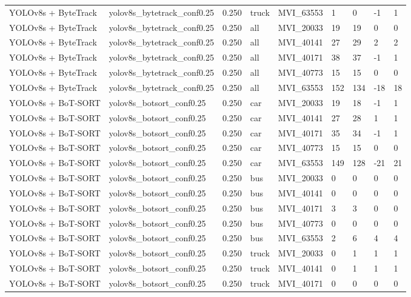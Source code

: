 \begin{tabular}{lllllllll}
YOLOv8s + ByteTrack & yolov8s\_bytetrack\_conf0.25 & 0.250 & truck & MVI\_63553 & 1 & 0 & -1 & 1 \\
YOLOv8s + ByteTrack & yolov8s\_bytetrack\_conf0.25 & 0.250 & all & MVI\_20033 & 19 & 19 & 0 & 0 \\
YOLOv8s + ByteTrack & yolov8s\_bytetrack\_conf0.25 & 0.250 & all & MVI\_40141 & 27 & 29 & 2 & 2 \\
YOLOv8s + ByteTrack & yolov8s\_bytetrack\_conf0.25 & 0.250 & all & MVI\_40171 & 38 & 37 & -1 & 1 \\
YOLOv8s + ByteTrack & yolov8s\_bytetrack\_conf0.25 & 0.250 & all & MVI\_40773 & 15 & 15 & 0 & 0 \\
YOLOv8s + ByteTrack & yolov8s\_bytetrack\_conf0.25 & 0.250 & all & MVI\_63553 & 152 & 134 & -18 & 18 \\
YOLOv8s + BoT-SORT & yolov8s\_botsort\_conf0.25 & 0.250 & car & MVI\_20033 & 19 & 18 & -1 & 1 \\
YOLOv8s + BoT-SORT & yolov8s\_botsort\_conf0.25 & 0.250 & car & MVI\_40141 & 27 & 28 & 1 & 1 \\
YOLOv8s + BoT-SORT & yolov8s\_botsort\_conf0.25 & 0.250 & car & MVI\_40171 & 35 & 34 & -1 & 1 \\
YOLOv8s + BoT-SORT & yolov8s\_botsort\_conf0.25 & 0.250 & car & MVI\_40773 & 15 & 15 & 0 & 0 \\
YOLOv8s + BoT-SORT & yolov8s\_botsort\_conf0.25 & 0.250 & car & MVI\_63553 & 149 & 128 & -21 & 21 \\
YOLOv8s + BoT-SORT & yolov8s\_botsort\_conf0.25 & 0.250 & bus & MVI\_20033 & 0 & 0 & 0 & 0 \\
YOLOv8s + BoT-SORT & yolov8s\_botsort\_conf0.25 & 0.250 & bus & MVI\_40141 & 0 & 0 & 0 & 0 \\
YOLOv8s + BoT-SORT & yolov8s\_botsort\_conf0.25 & 0.250 & bus & MVI\_40171 & 3 & 3 & 0 & 0 \\
YOLOv8s + BoT-SORT & yolov8s\_botsort\_conf0.25 & 0.250 & bus & MVI\_40773 & 0 & 0 & 0 & 0 \\
YOLOv8s + BoT-SORT & yolov8s\_botsort\_conf0.25 & 0.250 & bus & MVI\_63553 & 2 & 6 & 4 & 4 \\
YOLOv8s + BoT-SORT & yolov8s\_botsort\_conf0.25 & 0.250 & truck & MVI\_20033 & 0 & 1 & 1 & 1 \\
YOLOv8s + BoT-SORT & yolov8s\_botsort\_conf0.25 & 0.250 & truck & MVI\_40141 & 0 & 1 & 1 & 1 \\
YOLOv8s + BoT-SORT & yolov8s\_botsort\_conf0.25 & 0.250 & truck & MVI\_40171 & 0 & 0 & 0 & 0 \\

\end{tabular}
